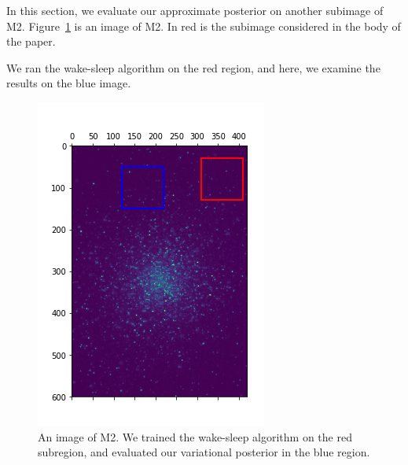In this section, we evaluate our approximate posterior on another subimage of M2. Figure~\ref{fig:marked_m2} is an image of M2. In red is the subimage considered in the body of the paper. 

We ran the wake-sleep algorithm on the red region, and here, we examine the results on the blue image. 

\begin{figure}
    \centering
    \includegraphics{figures/sdss_m2_image2_marked.png}
    \caption{An image of M2. We trained the wake-sleep algorithm on the red subregion, and evaluated our variational posterior in the blue region. }
    \label{fig:marked_m2}
\end{figure}

